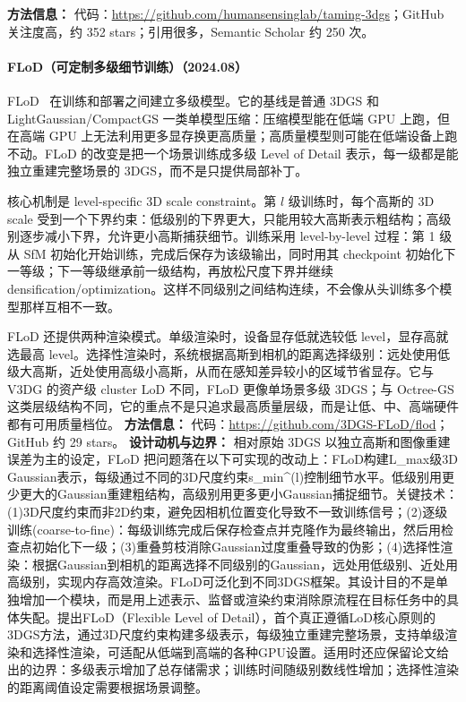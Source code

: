\textbf{方法信息：} 代码：\url{https://github.com/humansensinglab/taming-3dgs}；GitHub 关注度高，约 352 stars；引用很多，Semantic Scholar 约 250 次。



\paragraph{FLoD（可定制多级细节训练）（2024.08）}
FLoD~\cite{2408_12894} 在训练和部署之间建立多级模型。它的基线是普通 3DGS 和 LightGaussian/CompactGS 一类单模型压缩：压缩模型能在低端 GPU 上跑，但在高端 GPU 上无法利用更多显存换更高质量；高质量模型则可能在低端设备上跑不动。FLoD 的改变是把一个场景训练成多级 Level of Detail 表示，每一级都是能独立重建完整场景的 3DGS，而不是只提供局部补丁。

核心机制是 level-specific 3D scale constraint。第 $l$ 级训练时，每个高斯的 3D scale 受到一个下界约束：低级别的下界更大，只能用较大高斯表示粗结构；高级别逐步减小下界，允许更小高斯捕获细节。训练采用 level-by-level 过程：第 1 级从 SfM 初始化开始训练，完成后保存为该级输出，同时用其 checkpoint 初始化下一等级；下一等级继承前一级结构，再放松尺度下界并继续 densification/optimization。这样不同级别之间结构连续，不会像从头训练多个模型那样互相不一致。

FLoD 还提供两种渲染模式。单级渲染时，设备显存低就选较低 level，显存高就选最高 level。选择性渲染时，系统根据高斯到相机的距离选择级别：远处使用低级大高斯，近处使用高级小高斯，从而在感知差异较小的区域节省显存。它与 V3DG 的资产级 cluster LoD 不同，FLoD 更像单场景多级 3DGS；与 Octree-GS 这类层级结构不同，它的重点不是只追求最高质量层级，而是让低、中、高端硬件都有可用质量档位。
\textbf{方法信息：} 代码：\url{https://github.com/3DGS-FLoD/flod}；GitHub 约 29 stars。
\textbf{设计动机与边界：} 相对原始 3DGS 以独立高斯和图像重建误差为主的设定，FLoD 把问题落在以下可实现的改动上：FLoD构建L\_max级3D Gaussian表示，每级通过不同的3D尺度约束s\_min\^{}(l)控制细节水平。低级别用更少更大的Gaussian重建粗结构，高级别用更多更小Gaussian捕捉细节。关键技术：(1)3D尺度约束而非2D约束，避免因相机位置变化导致不一致训练信号；(2)逐级训练(coarse-to-fine)：每级训练完成后保存检查点并克隆作为最终输出，然后用检查点初始化下一级；(3)重叠剪枝消除Gaussian过度重叠导致的伪影；(4)选择性渲染：根据Gaussian到相机的距离选择不同级别的Gaussian，远处用低级别、近处用高级别，实现内存高效渲染。FLoD可泛化到不同3DGS框架。其设计目的不是单独增加一个模块，而是用上述表示、监督或渲染约束消除原流程在目标任务中的具体失配。提出FLoD（Flexible Level of Detail），首个真正遵循LoD核心原则的3DGS方法，通过3D尺度约束构建多级表示，每级独立重建完整场景，支持单级渲染和选择性渲染，可适配从低端到高端的各种GPU设置。适用时还应保留论文给出的边界：多级表示增加了总存储需求；训练时间随级别数线性增加；选择性渲染的距离阈值设定需要根据场景调整。
